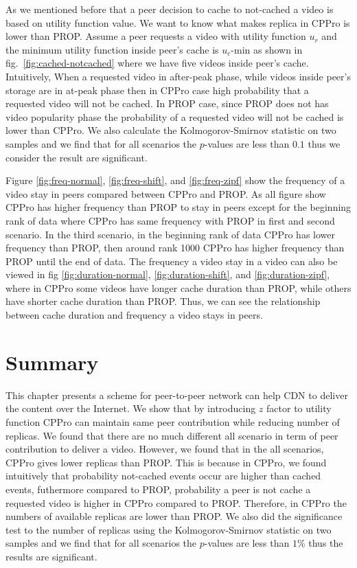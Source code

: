 As we mentioned before that a peer decision to cache to not-cached a video is based on utility function value.
We want to know what makes replica in CPPro is lower than PROP.
Assume a peer requests a video with utility function $u_r$ and the minimum utility function inside peer's cache is $u_c$-min as shown in fig.~\ref{fig:cached-notcached} where we have five videos inside peer's cache.
Intuitively, When a requested video in after-peak phase, while videos inside peer's storage are in at-peak phase then in CPPro case high probability that a requested video will not be cached.  
In PROP case, since PROP does not has video popularity phase the probability of a requested video will not be cached is lower than CPPro.
We also calculate the Kolmogorov-Smirnov statistic on two samples and we find that for all scenarios the $p$-values are less than $0.1$ thus we consider the result are significant. 



Figure \ref{fig:freq-normal}, \ref{fig:freq-shift}, and \ref{fig:freq-zipf} show the frequency of a video stay in peers compared between CPPro and PROP.
As all figure show CPPro has higher frequency than PROP to stay in peers except for the beginning rank of data where CPPro has same frequency with PROP in first and second scenario. 
In the third scenario, in the beginning rank of data CPPro has lower frequency than PROP, then around rank 1000 CPPro has higher frequency than PROP until the end of data. 
The frequency a video stay in a video can also be viewed in fig \ref{fig:duration-normal},  \ref{fig:duration-shift}, and \ref{fig:duration-zipf}, where in CPPro some videos have longer cache duration than PROP, while others have shorter cache duration than PROP.  
Thus, we can see the relationship between cache duration and frequency a video stays in peers. 


\section{Summary}
This chapter presents a scheme for peer-to-peer network can help CDN to deliver the content over the Internet. 
We show that by introducing $z$ factor to utility function CPPro can maintain same peer contribution while reducing number of replicas.
We found that there are no much different all scenario in term of peer contribution to deliver a video. 
However, we found that in the all scenarios, CPPro gives lower replicas than PROP. 
This is because in CPPro, we found intuitively that probability not-cached events occur are higher than cached events, futhermore compared to PROP, probability a peer is not cache a requested video is higher in CPPro compared to PROP.
Therefore, in CPPro the numbers of available replicas are lower than PROP. 
We also did the significance test to the number of replicas using the Kolmogorov-Smirnov statistic on two samples and we find that for all scenarios the $p$-values are less than $1$\% thus the results are significant. 

